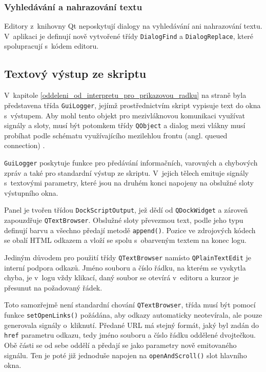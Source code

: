 \documentclass[11pt,twoside,a4paper]{book}
\begin{document}
\subsubsection{Vyhledávání a nahrazování textu}

Editory z~knihovny Qt neposkytují dialogy na vyhledávání ani nahrazování textu. V~aplikaci je definují nově vytvořené třídy \texttt{DialogFind} a \texttt{DialogReplace}, které spolupracují s~kódem editoru.


\subsection{Textový výstup ze skriptu}

V~kapitole \ref{oddeleni_od_interpretu_pro_prikazovou_radku} na straně \pageref{oddeleni_od_interpretu_pro_prikazovou_radku} byla představena třída \texttt{GuiLogger}, jejímž prostřednictvím skript vypisuje text do okna s~výstupem. Aby mohl tento objekt pro mezivláknovou komunikaci využívat signály a sloty, musí být potomkem třídy \texttt{QObject} a dialog mezi vlákny musí probíhat podle schématu využívajícího mezilehlou frontu (angl. queued connection) \cite{qt_threads}.

\texttt{GuiLogger} poskytuje funkce pro předávání informačních, varovných a chybových zpráv a také pro standardní výstup ze skriptu. V~jejich tělech emituje signály s~textovými parametry, které jsou na druhém konci napojeny na obslužné sloty výstupního okna.

Panel je tvořen třídou \texttt{DockScriptOutput}, jež dědí od \texttt{QDockWidget} a zároveň zapouzdřuje \texttt{QTextBrowser}. Obslužné sloty převezmou text, podle jeho typu definují barvu a všechno předají metodě \texttt{append()}. Pozice ve zdrojových kódech se obalí HTML odkazem a vloží se spolu s~obarveným textem na konec logu.

Jediným důvodem pro použití třídy \texttt{QTextBrowser} namísto \texttt{QPlainTextEdit} je interní podpora odkazů. Jméno souboru a číslo řádku, na kterém se vyskytla chyba, je v~logu vždy klikací, daný soubor se otevírá v~editoru a kurzor je přesunut na požadovaný řádek.

Toto samozřejmě není standardní chování \texttt{QTextBrowser}, třída musí být pomocí funkce \texttt{set\-Open\-Links()} požádána, aby odkazy automaticky neotevírala, ale pouze generovala signály o~kliknutí. Předané URL má stejný formát, jaký byl zadán do \texttt{href} parametru odkazu, tedy jméno souboru a číslo řádku oddělené dvojtečkou. Obě části se od sebe oddělí a předají se jako parametry nově emitovaného signálu. Ten je poté již jednoduše napojen na \texttt{openAndScroll()} slot hlavního okna.
\end{document}
